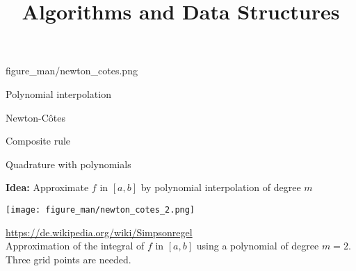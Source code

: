 \documentclass[11pt,compress,t,notes=noshow, xcolor=table]{beamer}
\title{Algorithms and Data Structures}
\begin{document}
{figure_man/newton_cotes.png}
{
  \item Polynomial interpolation
  \item Newton-C\^{o}tes
  \item Composite rule
}


\begin{vbframe}{Quadrature with polynomials}

\textbf{Idea:} Approximate $f$ in $[a, b]$ by polynomial interpolation of degree $m$

\begin{center}
\texttt{[image: figure\_man/newton\_cotes\_2.png]}
\begin{footnotesize}
\url{https://de.wikipedia.org/wiki/Simpsonregel}\\
Approximation of the integral of $f$ in $[a, b]$ using a polynomial of degree $m = 2$. Three grid points are needed.
\end{footnotesize}
\end{center}

\end{vbframe}
\end{document}
